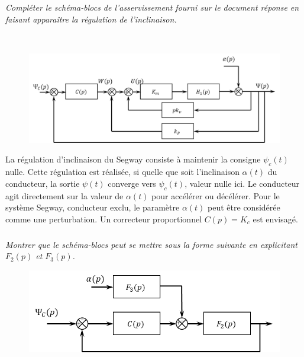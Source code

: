 \documentclass[10pt,fleqn]{article} %
\begin{document}
\subparagraph{\label{q_28}}\textit{Compléter le schéma-blocs de l’asservissement fourni sur le document réponse en faisant apparaître la régulation de l’inclinaison.}
\ifprof
\begin{corrige}~\\

\begin{figure}[H]
\centering
\includegraphics[width=0.7\linewidth]{cor_09}
\end{figure}


\end{corrige}
\else
\fi

\ifprof
\else
La régulation d’inclinaison du Segway consiste à maintenir la consigne $\psi_c(t)$ nulle. Cette régulation est réalisée, si quelle que soit l’inclinaison $\alpha(t)$ du conducteur, la sortie $\psi(t)$ converge vers $\psi_c(t)$, valeur nulle ici.
Le conducteur agit directement sur la valeur de $\alpha(t)$ pour accélérer ou décélérer. Pour le système Segway, conducteur exclu, le paramètre $\alpha(t)$ peut être considérée comme une perturbation.
Un correcteur proportionnel $C(p)=K_c$ est envisagé.

\fi


\subparagraph{\label{q_30_a}}\textit{Montrer que le schéma-blocs peut se mettre sous la forme suivante en explicitant $F_2(p)$ et $F_3(p)$.}
\ifprof
\else
\begin{figure}[H]
\centering
\includegraphics[width=0.6\linewidth]{fig_09}
\end{figure}
\fi
\end{document}

